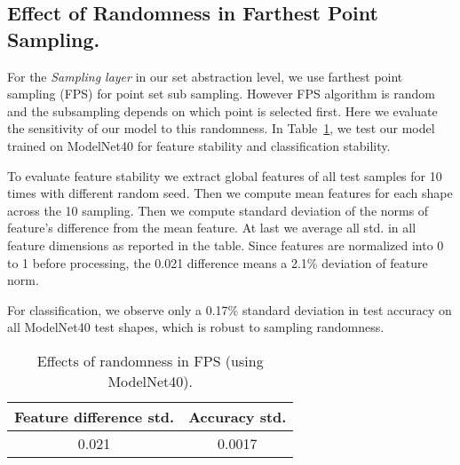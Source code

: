 \documentclass{article}
\newcommand{\todo}[1]{{\textcolor{red}{[\emph{TODO}: #1]}}}
\begin{document}
\begin{comment}
\paragraph{Effect of Input Set Density (number of points).}
\begin{table}[h!]
\centering
\begin{tabular}{cccc}
\toprule
512 & 1024 & 2048 & 4096 \\ \midrule
89.83 & 90.7 & 90.44 & 89.5 \\ \bottomrule
\end{tabular}
\caption{\todo{Effects of number of points/set sampling density (using ModelNet40).}}
\end{table}
\end{comment}

\subsection{Effect of Randomness in Farthest Point Sampling.}
For the \emph{Sampling layer} in our set abstraction level, we use farthest point sampling (FPS) for point set sub sampling. However FPS algorithm is random and the subsampling depends on which point is selected first. Here we evaluate the sensitivity of our model to this randomness. In Table~\ref{tab:fps}, we test our model trained on ModelNet40 for feature stability and classification stability.

To evaluate feature stability we extract global features of all test samples for 10 times with different random seed. Then we compute mean features for each shape across the 10 sampling. Then we compute standard deviation of the norms of feature's difference from the mean feature. At last we average all std. in all feature dimensions as reported in the table. Since features are normalized into 0 to 1 before processing, the 0.021 difference means a 2.1\% deviation of feature norm.

For classification, we observe only a 0.17\% standard deviation in test accuracy on all ModelNet40 test shapes, which is robust to sampling randomness.
\begin{table}[h!]
\centering
\begin{tabular}{cc}
\toprule
Feature difference std. & Accuracy std. \\ \midrule
 0.021 & 0.0017\\ \bottomrule
\end{tabular}
\caption{Effects of randomness in FPS (using ModelNet40). }
\label{tab:fps}
\end{table}
\end{document}
